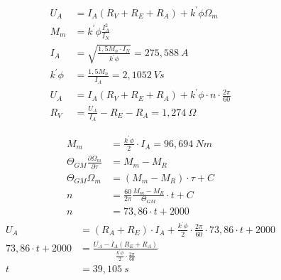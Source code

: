 \begin{solution}
\begin{compactenum}
\begin{align}
	U_A &= I_A ( R_V +R_E +R_A) +k^{'} \phi \Omega_m\\
	M_m &= k^{'} \phi \frac{I_A^2}{I_N}\\
	I_A &= \sqrt{\frac{1,5 M_n \cdot I_N}{k^{'} \phi}} = 275,588~A\\
	k^{'} \phi &= \frac{1,5 M_n}{I_A} = 2,1052~Vs\\
	U_A &= I_A (R_V +R_E +R_A) + k^{'} \phi \cdot n \cdot \frac{2 \pi}{60}\\
	R_V&= \frac{U_A}{I_A} -R_E -R_A= 1,274~\Omega
\end{align}
\item 
\begin{align}
	M_m &= \frac{k^{'} \phi}{2} \cdot I_A = 96,694~Nm\\
	\Theta_{GM} \frac{\partial \Omega_m}{\partial \tau} &= M_m -M_R\\
	\Theta_{GM} \Omega_m &= (M_m -M_R)\cdot \tau + C\\
	n&= \frac{60}{2\pi} \frac{M_m -M_R}{\Theta_{GM}}\cdot t + C\\
	n&= 73,86 \cdot t + 2000
\end{align}
\begin{align}
	U_A &= (R_A +R_E) \cdot I_A + \frac{k^{'} \phi}{2} \cdot \frac{2 \pi}{60}\cdot 73,86 \cdot t + 2000\\
	73,86\cdot t + 2000 &= \frac{U_A -I_A (R_E + R_A)}{\frac{k^{'} \phi}{2} \cdot \frac{2 \pi}{60}}\\
	t &= 39,105~s
\end{align}
\end{compactenum}
\end{solution}